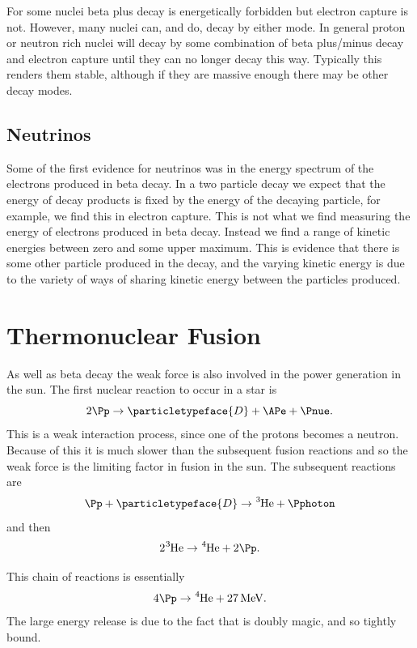 \documentclass[fleqn]{NotesClass}
\newcommand{\Pdeuteron}{\ensuremath{\particletypeface{D}}}
\begin{document}
    For some nuclei beta plus decay is energetically forbidden but electron capture is not.
    However, many nuclei can, and do, decay by either mode.
    In general proton or neutron rich nuclei will decay by some combination of beta plus/minus decay and electron capture until they can no longer decay this way.
    Typically this renders them stable, although if they are massive enough there may be other decay modes.
    
    \subsection{Neutrinos}
    Some of the first evidence for neutrinos was in the energy spectrum of the electrons produced in beta decay.
    In a two particle decay we expect that the energy of decay products is fixed by the energy of the decaying particle, for example, we find this in electron capture.
    This is not what we find measuring the energy of electrons produced in beta decay.
    Instead we find a range of kinetic energies between zero and some upper maximum.
    This is evidence that there is some other particle produced in the decay, and the varying kinetic energy is due to the variety of ways of sharing kinetic energy between the particles produced.
    
    \section{Thermonuclear Fusion}
    As well as beta decay the weak force is also involved in the power generation in the sun.
    The first nuclear reaction to occur in a star is
    \begin{equation}
        2\Pp \to \Pdeuteron + \APe + \Pnue.
    \end{equation}
    This is a weak interaction process, since one of the protons becomes a neutron.
    Because of this it is much slower than the subsequent fusion reactions and so the weak force is the limiting factor in fusion in the sun.
    The subsequent reactions are
    \begin{equation}
        \Pp + \Pdeuteron \to \ce{^3He} + \Pphoton
    \end{equation}
    and then
    \begin{equation}
        2\ce{^3He} \to \ce{^4He} + 2\Pp.
    \end{equation}
    
    This chain of reactions is essentially
    \begin{equation}
        4\Pp \to \ce{^4He} + \qty{27}{\MeV}.
    \end{equation}
    The large energy release is due to the fact that  is doubly magic, and so tightly bound.
    
\end{document}
